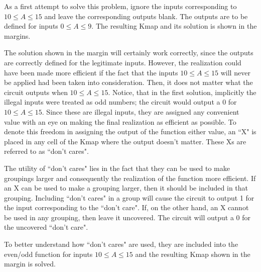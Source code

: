 \begin{changemargin}{1.5cm}{1.5cm}
As a first attempt to solve this problem, ignore the inputs 
corresponding to $10 \le A \le 15$ and leave the 
corresponding outputs blank.  The outputs are to be defined
for inputs $0 \le A \le 9$. The resulting Kmap and its solution
is shown in the margins.


The solution shown in the margin will certainly work correctly,
since the outputs are correctly defined for the legitimate inputs.
However, the realization could have been made more efficient
if the fact that the inputs $10 \le A \le 15$ will never be applied 
had been taken into consideration. Then, it does not matter what the 
circuit outputs when $10 \le A \le 15$.  Notice, that in the first 
solution, implicitly
the illegal inputs were treated as odd numbers; the circuit would
output a 0 for $10 \le A \le 15$. Since these are illegal inputs,
they are assigned any convenient value with an eye on making 
the final realization as
efficient as possible.  To denote this freedom in assigning the
output of the function either value, an ``X" is placed in any 
cell of the Kmap where the output doesn't matter.  These
Xs are referred to as ``don't cares".

The utility of ``don't cares" lies in the fact that they can be 
used to make groupings larger and consequently the realization
of the function more efficient.  If an X can be used to make a 
grouping larger, then it should be included in that grouping.
Including ``don't cares" in a group will cause the circuit to
output 1 for the input corresponding to the ``don't care".  
If, on the other hand,
an X cannot be used in any grouping, then leave it uncovered.
The circuit will output a 0 for the uncovered ``don't care".

To better understand how ``don't cares" are used, they are included
into the even/odd function for inputs $10 \le A \le 15$ and the
resulting Kmap shown in the margin is solved.


\end{changemargin}
